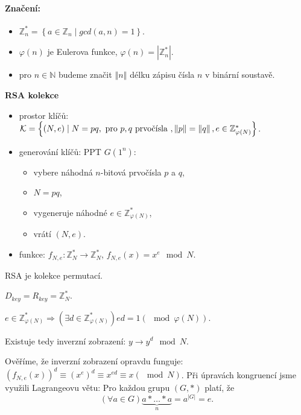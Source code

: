 \documentclass[a4paper,12pt,titlepage]{article}
\def\podnadpis#1{{\bigskip\bf\noindent#1\medskip\par}}
\def\pozorovani{\noindent {\bf Pozorování: }}
\def\dukaz{\noindent {\bf Důkaz: }}
\begin{document}
\paragraph{Značení:}
\begin{itemize}
  \item $\mathbb{Z}_n^\ast = \left\lbrace a \in \mathbb{Z}_n \mid gcd\left(a, n\right) = 1\right\rbrace$.
  \item $\varphi\left(n\right)$ je Eulerova funkce, $\varphi\left(n\right) = \left|\mathbb{Z}_n^\ast\right|$.
  \item pro $n \in \mathbb{N}$ budeme značit $\left\Vert n \right\Vert$ délku zápisu čísla $n$ v binární soustavě.
\end{itemize} 


\podnadpis{RSA kolekce}
\begin{itemize}
  \item prostor klíčů: $\mathcal{K} = \left\lbrace \left(N, e\right) \mid N = pq, \hbox{ pro } p,q \hbox{ prvočísla }, \left\Vert p\right\Vert = \left\Vert q\right\Vert, e \in \mathbb{Z}_{\varphi\left(N\right)}^\ast \right\rbrace$.
  
  \item generování klíčů: PPT $G\left(1^n\right)$: 
    \begin{itemize}
      \item vybere náhodná $n$-bitová prvočísla $p$ a $q$, 
      \item $N = pq$,
      \item vygeneruje náhodné $e \in \mathbb{Z}_{\varphi\left(N\right)}^\ast$,
      \item vrátí $\left(N,e\right)$.    
    \end{itemize}
  
  \item funkce: $f_{N, e}: \mathbb{Z}_N^\ast \rightarrow \mathbb{Z}_N^\ast$, $f_{N,e}\left(x\right) = x^e \mod N$.
\end{itemize}

\pozorovani RSA je kolekce permutací.

\dukaz $D_{key} = R_{key} = \mathbb{Z}_N^\ast$.

$e \in \mathbb{Z}_{\varphi\left(N\right)}^\ast \Longrightarrow \left(\exists{d \in \mathbb{Z}_{\varphi\left(N\right)}^\ast}\right) ed = 1 \left(\mod \varphi\left(N\right)\right)$.

Existuje tedy inverzní zobrazení: $y \longrightarrow y^d \mod N$.

Ověříme, že inverzní zobrazení opravdu funguje: $\left(f_{N,e}\left(x\right)\right)^d \equiv \left(x^e\right)^d \equiv x^{ed} \equiv x \left(\mod N\right)$.
Při úpravách kongruencí jsme využili Lagrangeovu větu: Pro každou grupu $\left(G, \ast\right)$ platí, že $$\left(\forall{a \in G}\right) \underbrace{a \ast \dots \ast a}_{n} = a^{\left| G\right|} = e.$$ 
\end{document}
